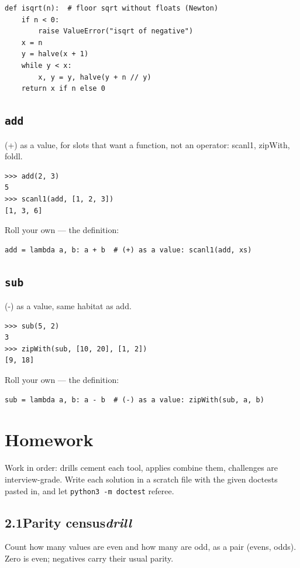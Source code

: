 \documentclass[10pt,letterpaper]{book}
\begin{document}
\begin{lstlisting}[style=ex]
def isqrt(n):  # floor sqrt without floats (Newton)
    if n < 0:
        raise ValueError("isqrt of negative")
    x = n
    y = halve(x + 1)
    while y < x:
        x, y = y, halve(y + n // y)
    return x if n else 0
\end{lstlisting}
\subsection{\texttt{add}}\label{def:add}
(+) as a value, for slots that want a function, not an operator: scanl1, zipWith, foldl.
\begin{lstlisting}[style=ex]
>>> add(2, 3)
5
>>> scanl1(add, [1, 2, 3])
[1, 3, 6]
\end{lstlisting}

Roll your own --- the definition:

\begin{lstlisting}[style=ex]
add = lambda a, b: a + b  # (+) as a value: scanl1(add, xs)
\end{lstlisting}

\subsection{\texttt{sub}}\label{def:sub}
(-) as a value, same habitat as add.
\begin{lstlisting}[style=ex]
>>> sub(5, 2)
3
>>> zipWith(sub, [10, 20], [1, 2])
[9, 18]
\end{lstlisting}

Roll your own --- the definition:

\begin{lstlisting}[style=ex]
sub = lambda a, b: a - b  # (-) as a value: zipWith(sub, a, b)
\end{lstlisting}

\section{Homework}
Work in order: drills cement each tool, applies combine them,
challenges are interview-grade. Write each solution in a scratch file with
the given doctests pasted in, and let \texttt{python3 -m doctest} referee.
\subsection*{2.1\quad Parity census\hfill\textnormal{\textit{drill}}}
Count how many values are even and how many are odd, as a pair (evens, odds). Zero is even; negatives carry their usual parity.
\end{document}
